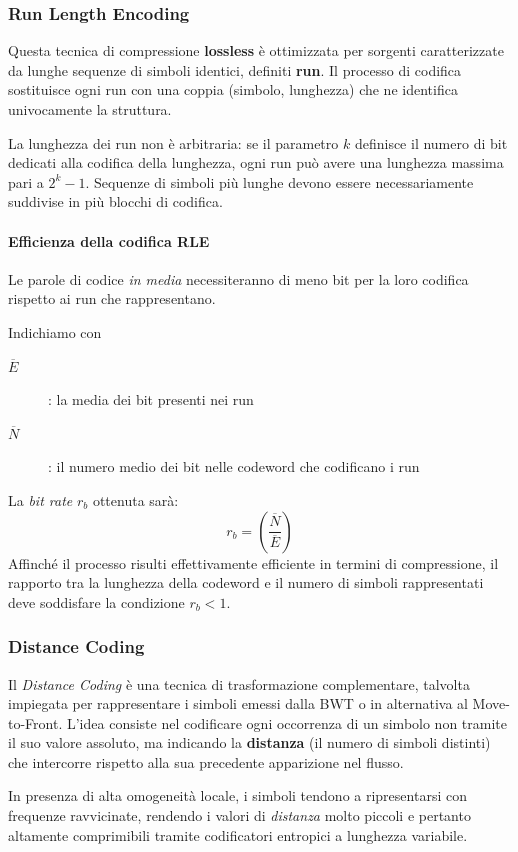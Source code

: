 \subsubsection{Run Length Encoding}
Questa tecnica di compressione \textbf{lossless} è ottimizzata per sorgenti caratterizzate da lunghe sequenze di simboli identici, definiti \textbf{run}. Il processo di codifica sostituisce ogni run con una coppia (simbolo, lunghezza) che ne identifica univocamente la struttura.

La lunghezza dei run non è arbitraria: se il parametro $k$ definisce il numero di bit dedicati alla codifica della lunghezza, ogni run può avere una lunghezza massima pari a $2^k - 1$. Sequenze di simboli più lunghe devono essere necessariamente suddivise in più blocchi di codifica.

\paragraph{Efficienza della codifica RLE}
Le parole di codice \textit{in media} necessiteranno di meno bit per la loro codifica rispetto ai run che rappresentano. 

Indichiamo con
\begin{description}
    \item[$\overline{E}$]: la media dei bit presenti nei run
    \item[$\overline{N}$]: il numero medio dei bit nelle codeword che codificano i run
\end{description}
La \textit{bit rate} $r_b$ ottenuta sarà:
\[r_b = \left(\frac{\overline{N}}{\overline{E}}\right)\]
Affinché il processo risulti effettivamente efficiente in termini di compressione, il rapporto tra la lunghezza della codeword e il numero di simboli rappresentati deve soddisfare la condizione $r_b < 1$.

\subsubsection{Distance Coding}
Il \textit{Distance Coding} è una tecnica di trasformazione complementare, talvolta impiegata per rappresentare i simboli emessi dalla BWT o in alternativa al Move-to-Front. L'idea consiste nel codificare ogni occorrenza di un simbolo non tramite il suo valore assoluto, ma indicando la \textbf{distanza} (il numero di simboli distinti) che intercorre rispetto alla sua precedente apparizione nel flusso. 

In presenza di alta omogeneità locale, i simboli tendono a ripresentarsi con frequenze ravvicinate, rendendo i valori di \textit{distanza} molto piccoli e pertanto altamente comprimibili tramite codificatori entropici a lunghezza variabile.
